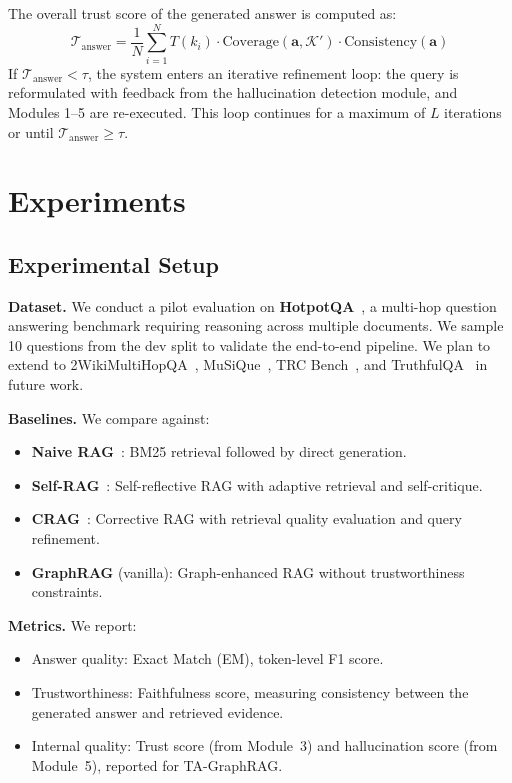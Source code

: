 \documentclass[11pt,a4paper]{article}
\begin{document}
The overall trust score of the generated answer is computed as:
\begin{equation}
    \mathcal{T}_{\text{answer}} = \frac{1}{N}\sum_{i=1}^{N} T(k_i) \cdot \text{Coverage}(\mathbf{a}, \mathcal{K}') \cdot \text{Consistency}(\mathbf{a})
\end{equation}
If $\mathcal{T}_{\text{answer}} < \tau$, the system enters an iterative refinement loop: the query is reformulated with feedback from the hallucination detection module, and Modules 1--5 are re-executed. This loop continues for a maximum of $L$ iterations or until $\mathcal{T}_{\text{answer}} \geq \tau$.

\section{Experiments}

\subsection{Experimental Setup}

\textbf{Dataset.} We conduct a pilot evaluation on \textbf{HotpotQA}~\cite{yang2018hotpotqa}, a multi-hop question answering benchmark requiring reasoning across multiple documents. We sample 10 questions from the dev split to validate the end-to-end pipeline. We plan to extend to 2WikiMultiHopQA~\cite{ho20202wiki}, MuSiQue~\cite{trivedi2022musique}, TRC Bench~\cite{zhou2024trustworthiness}, and TruthfulQA~\cite{lin2022truthfulqa} in future work.

\textbf{Baselines.} We compare against:
\begin{itemize}[leftmargin=*]
    \item \textbf{Naive RAG}~\cite{lewis2021retrievalaugmented}: BM25 retrieval followed by direct generation.
    \item \textbf{Self-RAG}~\cite{asai2024selfrag}: Self-reflective RAG with adaptive retrieval and self-critique.
    \item \textbf{CRAG}~\cite{yan2024corrective}: Corrective RAG with retrieval quality evaluation and query refinement.
    \item \textbf{GraphRAG} (vanilla): Graph-enhanced RAG without trustworthiness constraints.
\end{itemize}

\textbf{Metrics.} We report:
\begin{itemize}[leftmargin=*]
    \item Answer quality: Exact Match (EM), token-level F1 score.
    \item Trustworthiness: Faithfulness score, measuring consistency between the generated answer and retrieved evidence.
    \item Internal quality: Trust score (from Module~3) and hallucination score (from Module~5), reported for TA-GraphRAG.
\end{itemize}
\end{document}
